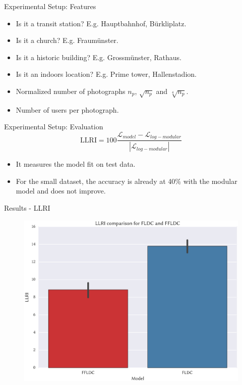\documentclass{beamer}
\begin{document}
\begin{frame}{Experimental Setup: Features}
  \begin{itemize}
    \item Is it a transit station? E.g. Hauptbahnhof, Bürkliplatz.
    \item Is it a church? E.g. Fraumünster.
    \item Is it a historic building? E.g. Grossmünster, Rathaus.
    \item Is it an indoors location? E.g. Prime tower, Hallenstadion.
    \item Normalized number of photographs $n_{p}$, $\sqrt{n_{p}}$ and $\sqrt[4]{n_{p}}$.
    \item Number of users per photograph.
  \end{itemize}
\end{frame}

\begin{frame}{Experimental Setup: Evaluation}
  \begin{equation*}
    \mathrm{LLRI} = 100\frac{\mathcal{L}_{model} - \mathcal{L}_{log-modular}}{|\mathcal{L}_{log-modular}|}
  \end{equation*}
  \begin{itemize}
    \item It measures the model fit on test data.
    \item For the small dataset, the accuracy is already at 40\% with the modular model and does not improve.
  \end{itemize}
\end{frame}

\begin{frame}{Results - LLRI}
  \begin{figure}
    \centering
    \includegraphics[width=.8\textwidth]{ffldc_10_llri}
  \end{figure}
\end{frame}
\end{document}
